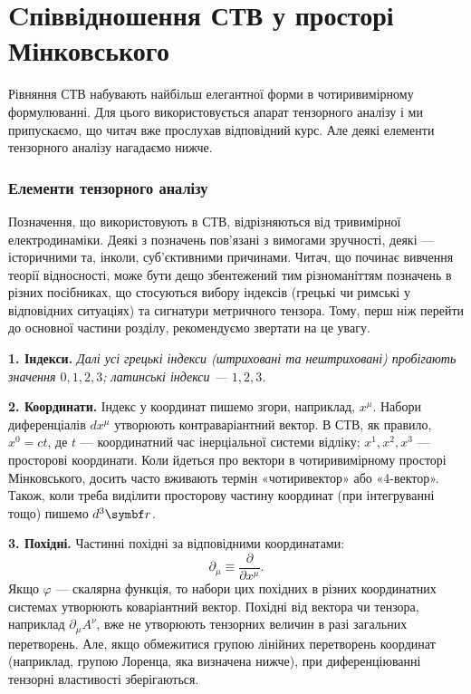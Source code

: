 \documentclass[%
biblatex,
]{ConspectBook}
\begin{document}
\chapter{Cпіввідношення СТВ у просторі Мінковського}\label{\currfilebase}

Рівняння СТВ набувають найбільш елегантної форми в чотиривимірному формулюванні. Для цього використовується апарат тензорного аналізу і ми припускаємо, що читач вже прослухав відповідний курс. Але деякі елементи тензорного аналізу  нагадаємо нижче.

\subsection*{Елементи тензорного аналізу}

Позначення, що використовують в СТВ, відрізняються від тривимірної
електродинаміки. Деякі з позначень пов'язані з вимогами зручності, деякі
--- історичними та, інколи, суб'єктивними причинами.
Читач, що починає вивчення теорії відносності, може бути дещо
збентежений тим різноманіттям позначень в різних посібниках, що
стосуються вибору індексів (грецькі чи римські у відповідних ситуаціях)
та сигнатури метричного тензора. Тому, перш ніж перейти до основної
частини розділу, рекомендуємо звертати на це увагу.

\textbf{1. Індекси.}
\textit{Далі усі грецькі індекси (штриховані та нештриховані) пробігають
значення $0,1,2,3$; латинські індекси --- $1,2,3$.}

\textbf{2. Координати.} Індекс у координат пишемо згори, наприклад,
$x^\mu$. Набори диференціалів $dx^\mu$ утворюють контраваріантний вектор. В
СТВ, як правило, $x^0 = ct$, де $t$ --- координатний час інерціальної
системи відліку; $x^1, x^2, x^3$ --- просторові координати. Коли
йдеться про вектори в чотиривимірному просторі Мінковського, досить
часто вживають термін «чотиривектор» або «4-вектор». Також, коли треба
виділити просторову частину координат (при інтегруванні тощо) пишемо
$d^3\vect{r}$.

\textbf{3. Похідні.} Частинні похідні за відповідними координатами:
\[
  \partial_\mu \equiv \frac{\partial}{\partial x^\mu}.
\]
Якщо $\varphi$ --- скалярна функція, то набори цих похідних в різних
координатних системах утворюють коваріантний вектор. Похідні від вектора
чи тензора, наприклад $\partial_\mu A^\nu$, вже не утворюють тензорних
величин в разі загальних перетворень. Але, якщо обмежитися групою
лінійних перетворень координат (наприклад, групою Лоренца, яка визначена
нижче), при диференціюванні тензорні властивості зберігаються.
\end{document}
